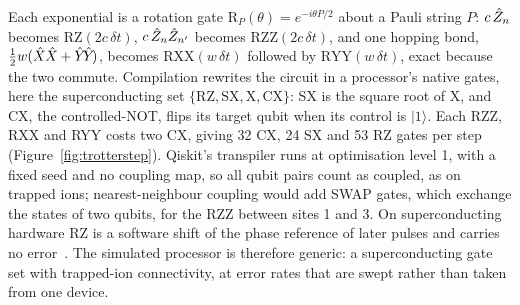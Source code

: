 Each exponential is a rotation gate $\mathrm{R}_P(\theta) = e^{-i\theta P/2}$
about a Pauli string $P$: $c\,\hat{Z}_{n}$ becomes $\mathrm{RZ}(2c\,\delta t)$,
$c\,\hat{Z}_{n}\hat{Z}_{n'}$ becomes $\mathrm{RZZ}(2c\,\delta t)$, and one hopping
bond, $\tfrac12 w(\hat{X}_{}\hat{X}_{} + \hat{Y}_{}\hat{Y}_{})$, becomes
$\mathrm{RXX}(w\,\delta t)$ followed by $\mathrm{RYY}(w\,\delta t)$, exact
because the two commute. Compilation rewrites the circuit in a processor's
native gates, here the superconducting set $\{\mathrm{RZ}, \mathrm{SX},
\mathrm{X}, \mathrm{CX}\}$: SX is the square root of X, and CX, the
controlled-NOT, flips its target qubit when its control is $|1\rangle$. Each
RZZ, RXX and RYY costs two CX, giving 32 CX, 24 SX and 53 RZ gates per step
(Figure~\ref{fig:trotterstep}). Qiskit's transpiler runs at optimisation level
1, with a fixed seed and no coupling map, so all qubit pairs count as coupled,
as on trapped ions; nearest-neighbour coupling would add SWAP gates, which
exchange the states of two qubits, for the RZZ between sites 1 and 3. On
superconducting hardware RZ is a software shift of the phase reference of later
pulses and carries no error~\cite{mckay2017}. The simulated processor is
therefore generic: a superconducting gate set with trapped-ion connectivity, at
error rates that are swept rather than taken from one device.

